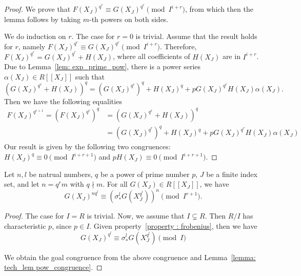 \begin{proof}
    We prove that $F(X_J)^{q^r} \equiv G(X_J)^{q^r} \pmod{I ^{i + r}}$, from which then the
    lemma follows by taking $m$-th powers on both sides. \par
    We do induction on $r$. The case for $r =0$ is trivial. Assume that
    the result holds for $r$, namely $F(X_J)^{q^r} \equiv G(X_J)^{q^r} \pmod{I ^{i + r}}$.
    Therefore, $F(X_J) ^ {q^r} = G(X_J)^{q^r} + H(X_J)$, where all coefficients of $H(X_J)$
    are in $I^{i + r}$. Due to Lemma~\ref{lem: exp_prime_pow}, there is a power series
    $\alpha (X_J) \in R [\![X_J]\!]$ such that
    \[ (G(X_J)^{q^r} + H(X_J))^q
        = (G(X_J)^{q^r})^q + H(X_J) ^ q + p G(X_J)^{q^r} H(X_J) \alpha (X_J). \]
    Then we have the following equalities
    \begin{align*}
        F(X_J)^{q^{r+1}} = (F(X_J)^{q^r})^q &= (G(X_J)^{q^r} + H(X_J))^q \\
        &= (G(X_J)^{q^r})^q + H(X_J) ^ q + p G(X_J)^{q^r} H(X_J) \alpha (X_J)
    \end{align*}
    Our result is given by the following two congruences:
    $H(X_J)^q \equiv 0 \pmod{I ^{i + r + 1}}$ and $p H(X_J) \equiv 0 \pmod{I ^{i + r + 1}}$.
\end{proof}

\begin{lemma}
    Let $n,l$ be natrual numbers, $q$ be a power of prime number $p$, $J$ be a finite index set, and
    let $n=q^r m$ with $q \nmid m$. For all $G(X_J) \in R [\![X_J]\!]$, we have
    \[G (X_J)^{nq ^ l} \equiv (\sigma _*^l G (X_J^{q^l})) ^ n \pmod{I ^{r + 1}}.\]

    \label{lem: tech_lem_two}
\end{lemma}

\begin{proof}
    The case for $I = R$ is trivial. Now, we assume that $I \subsetneq R$. Then $R / I$ has
    characteristic $p$, since $p \in I$. Given property~\ref{property : frobenius}, then we have
    \begin{equation*}
        G(X_J) ^{q^l} \equiv \sigma^l_*G(X_J^{q^l}) \pmod{I}
    \end{equation*}

    We obtain the goal congruence from the above congruence and Lemma~\ref{lemma: tech_lem pow_congruence}.
\end{proof}

